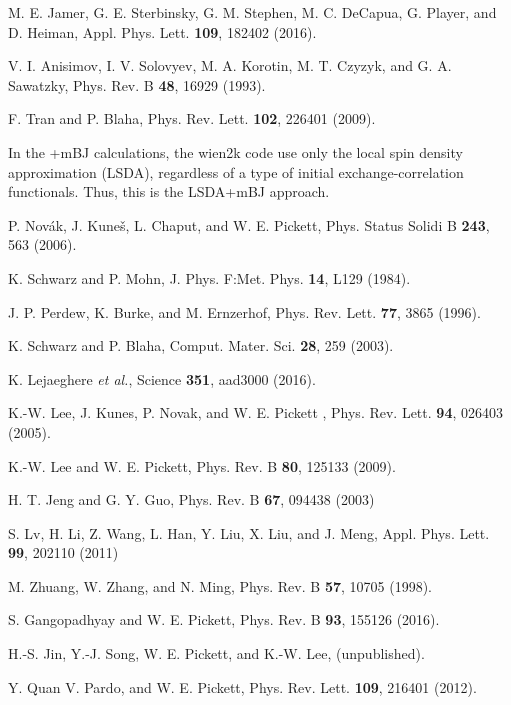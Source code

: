 \documentclass[preprint,5p]{elsarticle}
\begin{document}
\begin{thebibliography}{10}
 M. E. Jamer, G. E. Sterbinsky, G. M. Stephen, M. C. DeCapua, G. Player, and D. Heiman, 
 Appl. Phys. Lett. {\bf 109}, 182402 (2016).



 V. I. Anisimov, I. V. Solovyev, M. A. Korotin, M. T. Czyzyk, and G. A. Sawatzky, 
 Phys. Rev. B {\bf 48}, 16929 (1993).

 F. Tran and P. Blaha,
 Phys. Rev. Lett. {\bf 102}, 226401 (2009).

 In the +mBJ calculations, 
the {\sc wien2k} code use only the local spin density approximation (LSDA),
regardless of a type of initial exchange-correlation functionals.
Thus, this is the LSDA+mBJ approach.

 P. Nov\'{a}k, J. Kune\v{s}, L. Chaput, and W. E. Pickett, 
 Phys. Status Solidi B {\bf 243}, 563 (2006).

 K. Schwarz and P. Mohn, 
 J. Phys. F:Met. Phys. {\bf 14}, L129 (1984).

 J. P. Perdew, K. Burke, and M. Ernzerhof,
 Phys. Rev. Lett. {\bf 77}, 3865 (1996).

 K. Schwarz and P. Blaha,
 Comput. Mater. Sci. {\bf 28}, 259 (2003).

 K. Lejaeghere {\it et al.},
  Science {\bf 351}, aad3000 (2016).


%
 K.-W. Lee, J. Kunes, P. Novak, and W. E. Pickett  ,
 Phys. Rev. Lett. {\bf 94}, 026403 (2005).


 K.-W. Lee and W. E. Pickett, 
 Phys. Rev. B {\bf 80}, 125133 (2009).

 H. T. Jeng and G. Y. Guo, 
 Phys. Rev. B {\bf 67}, 094438 (2003)

 S. Lv, H. Li, Z. Wang, L. Han, Y. Liu, X. Liu, and J. Meng, 
 Appl. Phys. Lett. {\bf 99}, 202110 (2011)

 M. Zhuang, W. Zhang, and N. Ming, 
 Phys. Rev. B {\bf 57}, 10705 (1998).

 S. Gangopadhyay and W. E. Pickett,
 Phys. Rev. B {\bf 93}, 155126 (2016). 

 H.-S. Jin, Y.-J. Song, W. E. Pickett, and K.-W. Lee,
 (unpublished).

 Y. Quan V. Pardo, and W. E. Pickett,
 Phys. Rev. Lett. {\bf 109}, 216401  (2012). 


\end{thebibliography}
\end{document}
